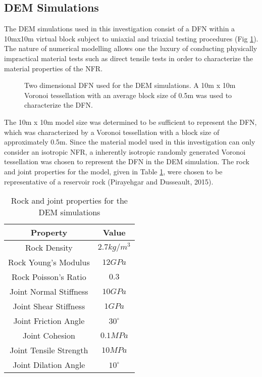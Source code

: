 \subsection{DEM Simulations}

The DEM simulations used in this investigation consist of a DFN within
a 10mx10m virtual block subject to uniaxial and triaxial testing
procedures (Fig \ref{fig:vorDFN}). The nature of numerical modelling
allows one the luxury of conducting physically impractical material
tests such as direct tensile tests in order to characterize the material
properties of the NFR.

\begin{figure}
\label{fig:vorDFN} \caption{Two dimensional DFN used for the DEM simulations. A 10m x 10m Voronoi
tessellation with an average block size of 0.5m was used to characterize
the DFN.}
\end{figure}


The 10m x 10m model size was determined to be sufficient to represent
the DFN, which was characterized by a Voronoi tessellation with a
block size of approximately 0.5m. Since the material model used in
this investigation can only consider an isotropic NFR, a inherently
isotropic randomly generated Voronoi tessellation was chosen to represent
the DFN in the DEM simulation. The rock and joint properties for the
model, given in Table \ref{tab:demProp}, were chosen to be representative
of a reservoir rock (Pirayehgar and Dusseault, 2015).

\begin{table}[!htbp]
\centering \caption{Rock and joint properties for the DEM simulations}
\label{tab:demProp} %
\begin{tabular}{c c}
\hline 
Property  & Value \\
\hline 
Rock Density  & $2.7kg/m^{3}$ \\
Rock Young's Modulus  & $12GPa$ \\
Rock Poisson's Ratio  & $0.3$ \\
Joint Normal Stiffness  & $10GPa$ \\
Joint Shear Stiffness  & $1GPa$ \\
Joint Friction Angle  & $30^{\circ}$ \\
Joint Cohesion  & $0.1MPa$ \\
Joint Tensile Strength  & $10MPa$ \\
Joint Dilation Angle  & $10^{\circ}$ \\
\hline 
\end{tabular}
\end{table}


